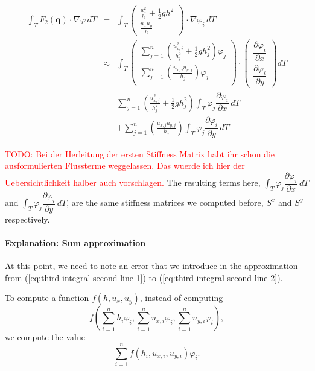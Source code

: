 \documentclass{article}
\newcommand{\todo}[2][]{\textcolor{red}{TODO\ifthenelse{\equal{#1}{}}{}{[#1]}: #2}}
\newcommand{\pd}[2]{\dfrac{\partial #1}{\partial #2}}
\renewcommand{\phi}{\varphi}
\begin{document}
\begin{eqnarray}
  \label{eq:third-integral-second-line-1}
  \int_T F_2(\mathbf{q}) \cdot \nabla \phi \, dT & = &
  \int_T
  \begin{pmatrix}
    \frac{u_x^2}{h} + \frac{1}{2} g h^2 \\ \frac{u_x u_y}{h}
  \end{pmatrix}
  \cdot \nabla \phi_i \, dT \\
  \label{eq:third-integral-second-line-2}
  & \approx &
  \int_T
  \begin{pmatrix}
    \sum_{j=1}^n \left(\frac{u_{x,j}^2}{h_j^2} + \frac{1}{2} g h_j^2\right) \phi_j \\
    \sum_{j=1}^n \left(\frac{u_{x,j} u_{y,j}}{h_j}\right) \phi_j \\
  \end{pmatrix}
  \cdot
  \begin{pmatrix}
    \pd{\phi_i}{x} \\
    \pd{\phi_i}{y}
  \end{pmatrix} dT \\
  & = & \nonumber \sum_{j=1}^n \left(\frac{u_{x,j}^2}{h_j^2} + \frac{1}{2} g h_j^2\right) \int_T \phi_j \pd{\phi_i}{x} \, dT \\
  & {} & + \nonumber \sum_{j=1}^n \left(\frac{u_{x,j} u_{y,j}}{h_j}\right) \int_T \phi_j \pd{\phi_i}{y} \, dT
\end{eqnarray}

\todo{Bei der Herleitung der ersten Stiffness Matrix habt ihr schon die ausformulierten Flussterme weggelassen. Das wuerde ich hier der Uebersichtlichkeit halber auch vorschlagen.}
The resulting terms here, $\int_T \phi_j \pd{\phi_i}{x} \, dT$ and $\int_T \phi_j \pd{\phi_i}{y} \, dT$, are the same stiffness matrices we computed before, $S^x$ and $S^y$ respectively.

\paragraph{Explanation: Sum approximation}
\label{par:sum-approx}

At this point, we need to note an error that we introduce in the approximation from (\ref{eq:third-integral-second-line-1}) to (\ref{eq:third-integral-second-line-2}).

To compute a function $f(h, u_x, u_y)$, instead of computing
\begin{equation*}
  f\left(\sum_{i=1}^n h_i \phi_i,
    \sum_{i=1}^n u_{x,i} \phi_i,
    \sum_{i=1}^n u_{y,i} \phi_i\right),
\end{equation*}
we compute the value
\begin{equation*}
  \sum_{i=1}^n f(h_i,u_{x,i},u_{y,i}) \phi_i.
\end{equation*}
\end{document}
